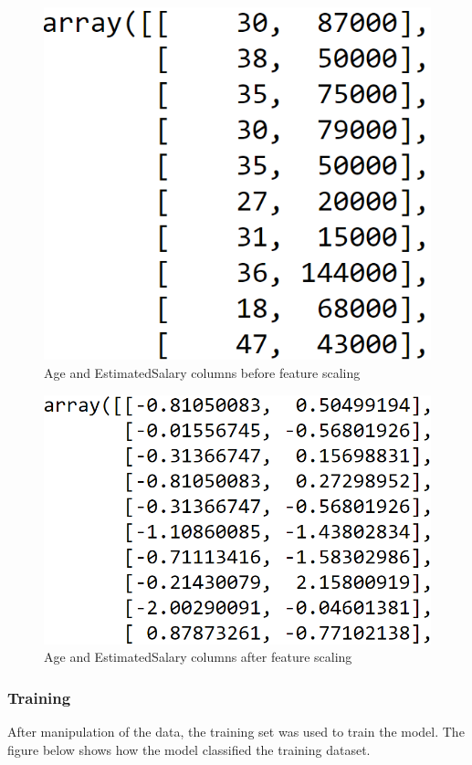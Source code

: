 \documentclass[conference]{IEEEtran}
\begin{document}
\begin{figure}[h]
    \centering
    \includegraphics[scale=0.40]{figs/beforeFscaling.png}
    \caption{Age and EstimatedSalary columns before feature scaling}
    \label{dabc}        
\end{figure}

\begin{figure}[h]
    \centering
    \includegraphics[scale=0.40]{figs/AfterFscaling.png}
    \caption{Age and EstimatedSalary columns after feature scaling}
    \label{dabc}        
\end{figure}


\subsubsection{Training}
After manipulation of the data, the training set was used to train the model. The figure below shows how the model classified the training dataset.
\end{document}
